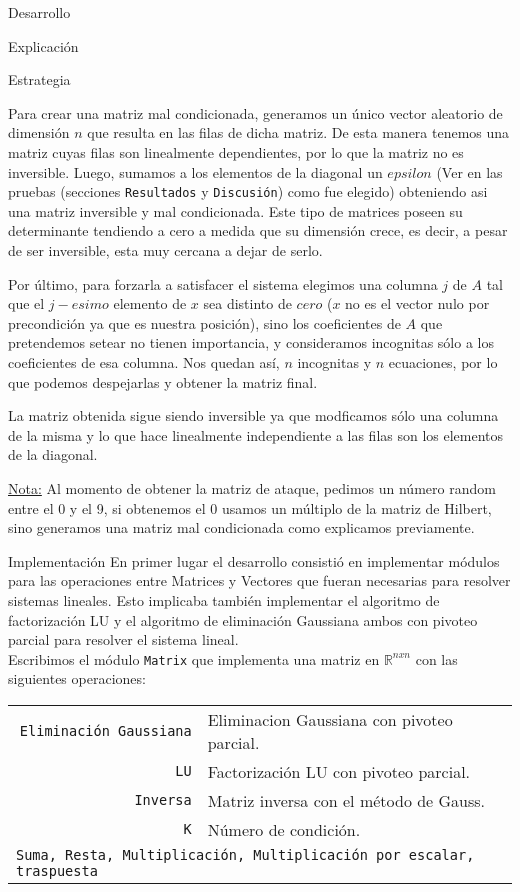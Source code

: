 \begin{section}{Desarrollo}
\begin{subsection}{Explicación}
\begin{subsubsection}{Estrategia}
\begin{enumerate}
			Para crear una matriz mal condicionada, generamos un único vector aleatorio de dimensión $n$ que resulta en las filas de dicha matriz. De esta manera tenemos una matriz cuyas filas son linealmente dependientes, por lo que la matriz no es inversible. Luego, sumamos a los elementos de la diagonal un $epsilon$ (Ver en las pruebas (secciones \texttt{Resultados} y \texttt{Discusión}) como fue elegido) obteniendo asi una matriz inversible y mal condicionada. Este tipo de matrices poseen su determinante tendiendo a cero a medida que su dimensión crece, es decir, a pesar de ser inversible, esta muy cercana a dejar de serlo.
			
			Por último, para forzarla a satisfacer el sistema elegimos una columna $j$ de $A$ tal que el $j-esimo$ elemento de $x$ sea distinto de $cero$ ($x$ no es el vector nulo por precondición ya que es nuestra posición), sino los coeficientes de $A$ que pretendemos setear no tienen importancia, y consideramos incognitas sólo a los coeficientes de esa columna. Nos quedan así, $n$ incognitas y $n$ ecuaciones, por lo que podemos despejarlas y obtener la matriz final.
			
			La matriz obtenida sigue siendo inversible ya que modficamos sólo una columna de la misma y lo que hace linealmente independiente a las filas son los elementos de la diagonal.
			
			\underline{Nota:} Al momento de obtener la matriz de ataque, pedimos un número random entre el 0 y el 9, si obtenemos el 0 usamos un múltiplo de la matriz de Hilbert, sino generamos una matriz mal condicionada como explicamos previamente.
			\end{enumerate}
		\end{subsubsection}
	\end{subsection}
	\begin{subsection}{Implementación}
		En primer lugar el desarrollo consistió en implementar módulos para las operaciones entre Matrices y Vectores que fueran necesarias para resolver sistemas lineales. Esto implicaba también implementar el algoritmo de factorización LU y el algoritmo de eliminación Gaussiana ambos con pivoteo parcial para resolver el sistema lineal.\\
		
		Escribimos el módulo \texttt{Matrix} que implementa una matriz en $\mathbb{R}^{nxn}$ con las siguientes operaciones:\\
		
		\begin{tabular}{rl}
			\texttt{Eliminación Gaussiana} & Eliminacion Gaussiana con pivoteo parcial.\\
			\texttt{LU} & Factorización LU con pivoteo parcial.\\
			\texttt{Inversa} & Matriz inversa con el método de Gauss.\\
			\texttt{K} & Número de condición.\\
			\multicolumn{2}{l}{
				\texttt{Suma, Resta, Multiplicación, Multiplicación por escalar, traspuesta}
			}
		\end{tabular}\\
		

\end{subsection}
\end{section}
